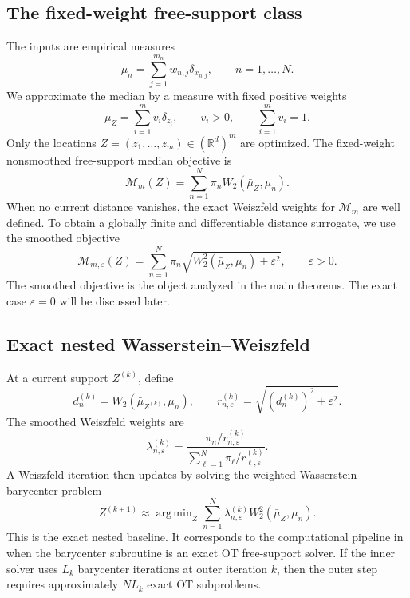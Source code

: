 \documentclass[pdflatex,sn-mathphys-ay]{sn-jnl}%
\theoremstyle{thmstyleone}%
\theoremstyle{thmstyletwo}%
\theoremstyle{thmstylethree}%
\DeclareMathOperator*{\argmin}{arg\,min}
\newcommand{\R}{\mathbb R}
\newcommand{\calM}{\mathcal M}
\newcommand{\eps}{\varepsilon}
\newcommand{\barmu}{\bar\mu}
\begin{document}
\subsection{The fixed-weight free-support class}

The inputs are empirical measures
\[
    \mu_n=\sum_{j=1}^{m_n}w_{n,j}\delta_{x_{n,j}},
    \qquad n=1,\ldots,N.
\]
We approximate the median by a measure with fixed positive weights
\begin{equation}\label{eq:candidate}
    \barmu_Z=\sum_{i=1}^m v_i\delta_{z_i},
    \qquad v_i>0,
    \qquad \sum_{i=1}^m v_i=1.
\end{equation}
Only the locations \(Z=(z_1,\ldots,z_m)\in(\R^d)^m\) are optimized. The fixed-weight nonsmoothed free-support median objective is
\begin{equation}\label{eq:discrete-median}
    \calM_m(Z)=\sum_{n=1}^N \pi_n W_2(\barmu_Z,\mu_n).
\end{equation}
When no current distance vanishes, the exact Weiszfeld weights for \(\calM_m\) are well defined. To obtain a globally finite and differentiable distance surrogate, we use the smoothed objective
\begin{equation}\label{eq:smoothed-objective}
    \calM_{m,\eps}(Z)
    =
    \sum_{n=1}^N\pi_n
    \sqrt{W_2^2(\barmu_Z,\mu_n)+\eps^2},
    \qquad \eps>0.
\end{equation}
The smoothed objective is the object analyzed in the main theorems. The exact case \(\eps=0\) will be discussed later. 

\subsection{Exact nested Wasserstein--Weiszfeld}

At a current support \(Z^{(k)}\), define
\[
    d_n^{(k)}=W_2(\barmu_{Z^{(k)}},\mu_n),
    \qquad
    r_{n,\eps}^{(k)}=\sqrt{(d_n^{(k)})^2+\eps^2}.
\]
The smoothed Weiszfeld weights are
\begin{equation}\label{eq:lambda}
    \lambda_{n,\eps}^{(k)}
    =
    \frac{\pi_n/r_{n,\eps}^{(k)}}
    {\sum_{\ell=1}^N\pi_\ell/r_{\ell,\eps}^{(k)}}.
\end{equation}
A Weiszfeld iteration then updates by solving the weighted Wasserstein barycenter problem
\begin{equation}\label{eq:nested-barycenter}
    Z^{(k+1)}\approx
    \argmin_Z
    \sum_{n=1}^N \lambda_{n,\eps}^{(k)} W_2^2(\barmu_Z,\mu_n).
\end{equation}
This is the exact nested baseline. It corresponds to the computational pipeline in \citet{you_2025_WassersteinMedianProbability} when the barycenter subroutine is an exact OT free-support solver. If the inner solver uses \(L_k\) barycenter iterations at outer iteration \(k\), then the outer step requires approximately \(N L_k\) exact OT subproblems.
\end{document}
